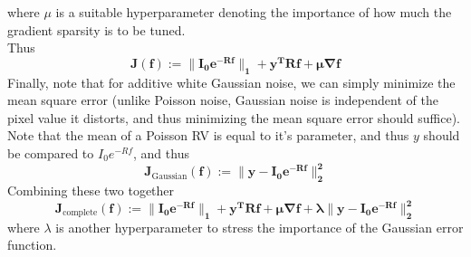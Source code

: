\documentclass[a4paper,14pt]{article}
\numberwithin{definition}{section}
\numberwithin{mytheorem}{subsection}
\begin{document}
where $\mu$ is a suitable hyperparameter denoting the importance of how much the gradient sparsity is to be tuned.\\
Thus
$$\boldsymbol{J(f) := \lVert I_0e^{-Rf}\rVert_1 + y^TRf + \mu\nabla f}$$
Finally, note that for additive white Gaussian noise, we can simply minimize the mean square error (unlike Poisson noise, Gaussian noise is independent of the pixel value it distorts, and thus minimizing the mean square error should suffice). Note that the mean of a Poisson RV is equal to it's parameter, and thus $y$ should be compared to $I_0e^{-Rf}$, and thus 
$$\boldsymbol{J_{\mathrm{Gaussian}}(f) := \lVert y - I_0e^{-Rf}\rVert^2_2}$$
Combining these two together
$$\boldsymbol{J_{\mathrm{complete}}(f) := \lVert I_0e^{-Rf}\rVert_1 + y^TRf + \mu\nabla f + \lambda\lVert y - I_0e^{-Rf}\rVert^2_2}$$
where $\lambda$ is another hyperparameter to stress the importance of the Gaussian error function.
\end{document}
